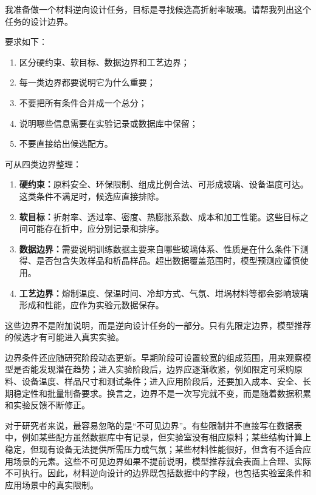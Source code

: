 \begin{samepage}
\begin{userbox}
我准备做一个材料逆向设计任务，目标是寻找候选高折射率玻璃。请帮我列出这个任务的设计边界。

要求如下：
\begin{enumerate}
\item 区分硬约束、软目标、数据边界和工艺边界；
\item 每一类边界都要说明它为什么重要；
\item 不要把所有条件合并成一个总分；
\item 说明哪些信息需要在实验记录或数据库中保留；
\item 不要直接给出候选配方。
\end{enumerate}
\end{userbox}

\begin{aibox}
可从四类边界整理：

\begin{enumerate}
\item \textbf{硬约束：}原料安全、环保限制、组成比例合法、可形成玻璃、设备温度可达。这类条件不满足时，候选应直接排除。
\item \textbf{软目标：}折射率、透过率、密度、热膨胀系数、成本和加工性能。这些目标之间可能存在折中，应分别记录和排序。
\item \textbf{数据边界：}需要说明训练数据主要来自哪些玻璃体系、性质是在什么条件下测得、是否包含失败样品和析晶样品。超出数据覆盖范围时，模型预测应谨慎使用。
\item \textbf{工艺边界：}熔制温度、保温时间、冷却方式、气氛、坩埚材料等都会影响玻璃形成和性能，应作为实验元数据保存。
\end{enumerate}

这些边界不是附加说明，而是逆向设计任务的一部分。只有先限定边界，模型推荐的候选才有可能进入真实实验。
\end{aibox}
\end{samepage}

边界条件还应随研究阶段动态更新。早期阶段可设置较宽的组成范围，用来观察模型是否能发现潜在趋势；进入实验阶段后，边界应逐渐收紧，例如限定可采购原料、设备温度、样品尺寸和测试条件；进入应用阶段后，还要加入成本、安全、长期稳定性和批量制备要求。换言之，边界不是一次写完就不变，而是随着数据积累和实验反馈不断修正。

对于研究者来说，最容易忽略的是“不可见边界”。有些限制并不直接写在数据表中，例如某些配方虽然数据库中有记录，但实验室没有相应原料；某些结构计算上稳定，但现有设备无法提供所需压力或气氛；某些材料性能很好，但含有不适合应用场景的元素。这些不可见边界如果不提前说明，模型推荐就会表面上合理、实际不可执行。因此，材料逆向设计的边界既包括数据中的字段，也包括实验室条件和应用场景中的真实限制。

